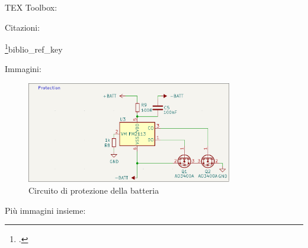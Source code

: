 TEX Toolbox: 

Citazioni:

\cite{riscv}
\footcite{Small description}{biblio_ref_key}

Immagini:

\begin{figure}[H]
  \centering
  \includegraphics[width=0.8\textwidth]{images/chapter2/protection.png}
  \caption{Circuito di protezione della batteria}\label{fig:protection}
\end{figure}

Più immagini insieme:

